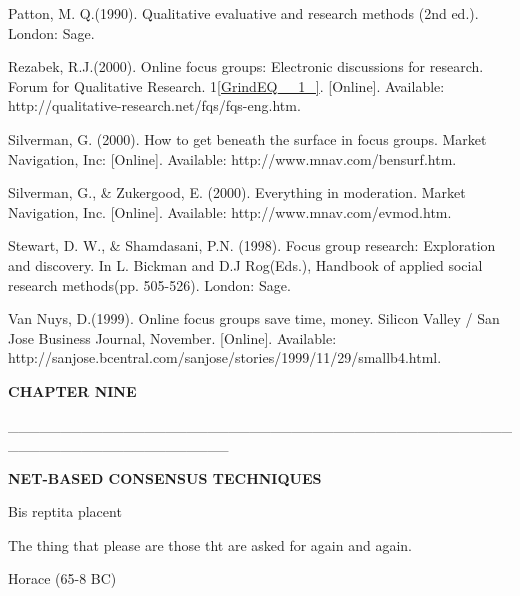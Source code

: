 \noindent Patton, M. Q.(1990). Qualitative evaluative and research methods (2nd ed.). London: Sage.

\noindent Rezabek, R.J.(2000). Online focus groups: Electronic discussions for research. Forum for Qualitative Research. 1\eqref{GrindEQ__1_}. [Online]. Available: http://qualitative-research.net/fqs/fqs-eng.htm.

\noindent Silverman, G. (2000). How to get beneath the surface in focus groups. Market Navigation, Inc: [Online]. Available: http://www.mnav.com/bensurf.htm.

\noindent Silverman, G., \& Zukergood, E. (2000). Everything in moderation. Market Navigation, Inc. [Online]. Available: http://www.mnav.com/evmod.htm.

\noindent Stewart, D. W., \& Shamdasani, P.N. (1998). Focus group research: Exploration and discovery. In L. Bickman and D.J Rog(Eds.), Handbook of applied social research methods(pp. 505-526). London: Sage.

\noindent Van Nuys, D.(1999). Online focus groups save time, money. Silicon Valley / San Jose Business Journal, November. [Online]. Available: http://sanjose.bcentral.com/sanjose/stories/1999/11/29/smallb4.html.

\noindent 

\noindent \textbf{                                                                                            CHAPTER NINE}

\noindent                                    \_\_\_\_\_\_\_\_\_\_\_\_\_\_\_\_\_\_\_\_\_\_\_\_\_\_\_\_\_\_\_\_\_\_\_\_\_\_\_\_\_\_\_\_\_\_\_\_\_\_\_\_\_\_\_\_\_\_\_\_\_\_\_\_\_\_\_\_\_

\noindent             

\noindent                                                                               \textbf{NET-BASED CONSENSUS TECHNIQUES}

\noindent 

\noindent 

\noindent 

\noindent 

\noindent Bis reptita placent

\noindent The thing that please are those tht are asked for again and again.

\noindent Horace (65-8 BC)

\noindent 

\noindent 

\noindent 

\noindent 

